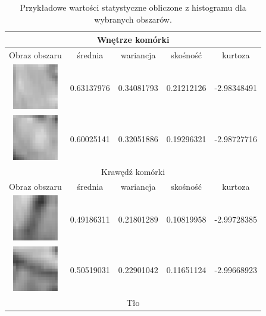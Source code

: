 \begin{center}
\begin{table}[htb]	%
\label{texture-feat-histogram}
\caption{Przykładowe wartości statystyczne obliczone z histogramu dla wybranych obszarów.}
\begin{tabular}{|c|c|c|c|c|}
\hline
\multicolumn{5}{c}{Wnętrze komórki} \\ \hline
Obraz obszaru & średnia & wariancja & skośność & kurtoza \\ \hline
\includegraphics[width=2cm]{./../img/texture-feats-examples/internal/lspot-0163-0202.eps}
	& 0.63137976 & 0.34081793 & 0.21212126 & -2.98348491 \\ \hline
\includegraphics[width=2cm]{./../img/texture-feats-examples/internal/lspot-0258-0153.eps}	
	& 0.60025141 & 0.32051886 & 0.19296321 & -2.98727716 \\ \hline
\multicolumn{5}{c}{Krawędź komórki} \\ \hline
Obraz obszaru & średnia & wariancja & skośność & kurtoza \\ \hline
\includegraphics[width=2cm]{./../img/texture-feats-examples/edge/lspot-0074-0134.eps}
	& 0.49186311 & 0.21801289 & 0.10819958 & -2.99728385 \\ \hline
\includegraphics[width=2cm]{./../img/texture-feats-examples/edge/lspot-0294-0093.eps}
	& 0.50519031 & 0.22901042 & 0.11651124 & -2.99668923 \\ \hline
\multicolumn{5}{c}{Tło} \\ \hline

\end{tabular}
\end{table}
\end{center}
